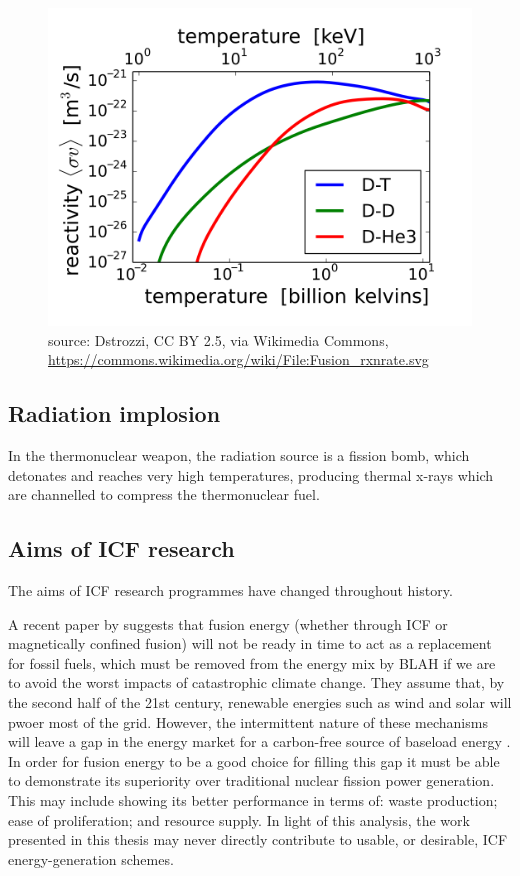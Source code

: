 \begin{figure}
 \centering
 \includegraphics[width=0.7\columnwidth]{Chapters/C1_Introduction/crossSection.png}
 \caption{source: Dstrozzi, CC BY 2.5, via Wikimedia Commons, \url{https://commons.wikimedia.org/wiki/File:Fusion_rxnrate.svg}} \label{fig:crossSection}
\end{figure}

\subsection{Radiation implosion}
In the thermonuclear weapon, the radiation source is a fission bomb, which detonates and reaches very high temperatures, producing thermal x-rays which are channelled to compress the thermonuclear fuel.

\subsection{Aims of ICF research}

The aims of ICF research programmes have changed throughout history.

A recent paper by \citet{Nicholas2021} suggests that fusion energy (whether through ICF or magnetically confined fusion) will not be ready in time to act as a replacement for fossil fuels, which must be removed from the energy mix by BLAH if we are to avoid the worst impacts of catastrophic climate change. They assume that, by the second half of the 21st century, renewable energies such as wind and solar will pwoer most of the grid. However, the intermittent nature of these mechanisms will leave a gap in the energy market for a carbon-free source of baseload energy \citep{Nicholas2021}. In order for fusion energy to be a good choice for filling this gap it must be able to demonstrate its superiority over traditional nuclear fission power generation. This may include showing its better performance in terms of: waste production; ease of proliferation; and resource supply. In light of this analysis, the work presented in this thesis may never directly contribute to usable, or desirable, ICF energy-generation schemes.

